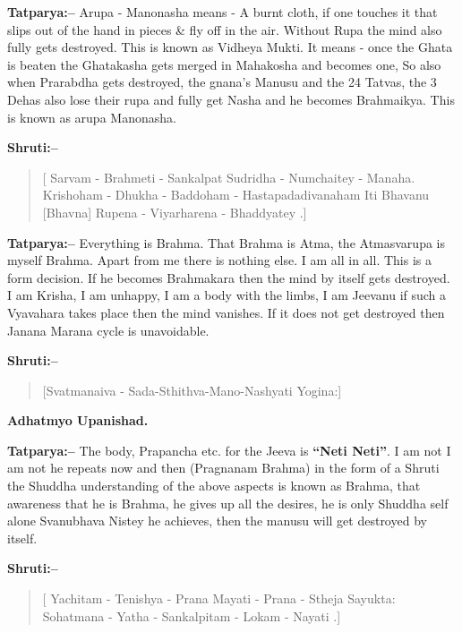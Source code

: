 \textbf{Tatparya:–} Arupa - Manonasha means - A burnt cloth, if one touches it that slips out of the hand in pieces \& fly off in the air. Without Rupa the mind also fully gets destroyed. This is known as Vidheya Mukti. It means - once the Ghata is beaten the Ghatakasha gets merged in Mahakosha and becomes one, So also when Prarabdha gets destroyed, the gnana's Manusu and the 24 Tatvas, the 3 Dehas also lose their rupa and fully get Nasha and he becomes Brahmaikya. This is known as arupa Manonasha.

\newpage

\textbf{Shruti:–}

\begin{verse}
[ Sarvam - Brahmeti - Sankalpat Sudridha - Numchaitey - Manaha.  Krishoham - Dhukha - Baddoham - Hastapadadivanaham  Iti Bhavanu [Bhavna] Rupena - Viyarharena - Bhaddyatey .]
\end{verse}

\textbf{Tatparya:–} Everything is Brahma. That Brahma is Atma, the Atmasvarupa is myself Brahma. Apart from me there is nothing else. I am all in all. This is a form decision. If he becomes Brahmakara then the mind by itself gets destroyed. I am Krisha, I am unhappy, I am a body with the limbs, I am Jeevanu if such a Vyavahara takes place then the mind vanishes. If it does not get destroyed then Janana Marana cycle is unavoidable.

\textbf{Shruti:–}

\begin{verse}
[Svatmanaiva - Sada-Sthithva-Mano-Nashyati Yogina:]
\end{verse}

\begin{flushright}
\textbf{Adhatmyo Upanishad.}
\end{flushright}

\textbf{Tatparya:–} The body, Prapancha etc. for the Jeeva is \textbf{“Neti Neti”}. I am not I am not he repeats now and then (Pragnanam Brahma) in the form of a Shruti the Shuddha understanding of the above aspects is known as Brahma, that awareness that he is Brahma, he gives up all the desires, he is only Shuddha self alone Svanubhava Nistey he achieves, then the manusu will get destroyed by itself.

\textbf{Shruti:–}

\begin{verse}
[ Yachitam - Tenishya - Prana Mayati - Prana - Stheja Sayukta:  Sohatmana - Yatha - Sankalpitam - Lokam - Nayati .]
\end{verse}

